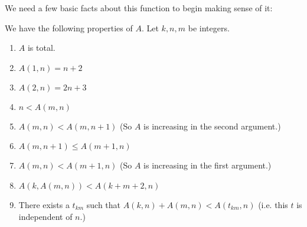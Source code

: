 \par We need a few basic facts about this function to begin making sense of it:
\begin{lemma}
    We have the following properties of $A$. Let $k,n,m$ be integers.
    \begin{enumerate}
        \item $A$ is total. 
        \item $A(1,n) = n+2$
        \item $A(2,n) = 2n+3$
        \item $n < A(m,n)$
        \item $A(m,n) < A(m,n+1)$ (So $A$ is increasing in the second argument.)
        \item $A(m,n+1) \leq A(m+1,n)$
        \item $A(m,n) < A(m+1,n)$ (So $A$ is increasing in the first argument.)
        \item $A(k,A(m,n)) < A(k+m+2,n)$
        \item There exists a $t_{km}$ such that $A(k,n)+A(m,n)<A(t_{km},n)$ (i.e. this $t$ is independent of $n$.)
    \end{enumerate}
\end{lemma}
